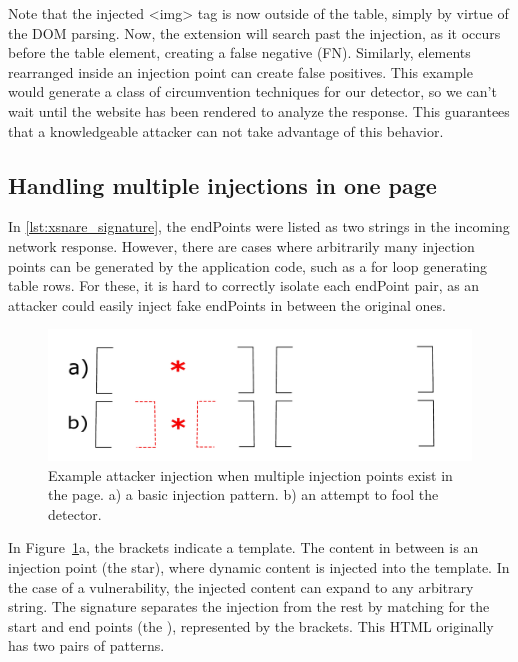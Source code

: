 Note that the injected <img> tag is now outside of the table, simply
by virtue of the DOM parsing. Now, the extension will search past the
injection, as it occurs before the table element, creating a false
negative (FN). Similarly, elements rearranged inside an injection
point can create false positives. This example would generate a class
of circumvention techniques for our detector, so we can't wait until
the website has been rendered to analyze the response. This guarantees
that a knowledgeable attacker can not take advantage of this
behavior.

\subsection{Handling multiple injections in one page} \label{multiple_injections}

In \autoref{lst:xsnare_signature}, the endPoints were listed as
two strings in the incoming network response. However, there are cases
where arbitrarily many injection points can be generated by the
application code, such as a for loop generating table rows. For these,
it is hard to correctly isolate each endPoint pair, as an attacker
could easily inject fake endPoints in between the original ones.

\begin{figure}[h]
	\begin{center}
	\includegraphics[scale=0.25]{img/attacker_injection_compound.pdf}
	\caption{Example attacker injection when multiple injection points exist in the page. a) a basic injection pattern. b) an attempt to fool the detector.}
	\label{fig:attacker_injection}
	\end{center}
\end{figure}

In Figure~\ref{fig:attacker_injection}a, the brackets indicate a
template. The content in between is an injection point (the star),
where dynamic content is injected into the template. In the case of a
vulnerability, the injected content can expand to any arbitrary
string. The signature separates the injection from the rest by
matching for the start and end points (the ),
represented by the brackets. This HTML originally has two pairs of
 patterns.


